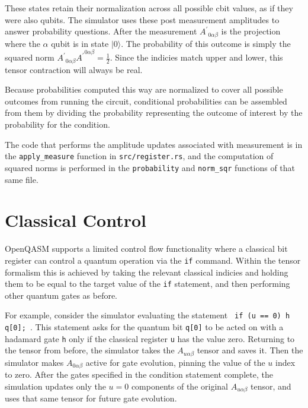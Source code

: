 \documentclass[%
 reprint,
 amsmath,amssymb,
 aps,
]{revtex4-2}
\begin{document}
These states retain their normalization across all possible cbit values, as if they were also qubits. The simulator uses these post measurement amplitudes to answer probability questions. After the measurement ${A^\prime}_{0 \alpha\beta}$ is the projection where the $\alpha$ qubit is in state $|0\rangle$. The probability of this outcome is simply the squared norm ${A^\prime}_{0 \alpha\beta}{A^\prime}^{0 \alpha\beta} = \frac{1}{2}$. Since the indicies match upper and lower, this tensor contraction will always be real. 

Because probabilities computed this way are normalized to cover all possible outcomes from running the circuit, conditional probabilities can be assembled from them by dividing the probability representing the outcome of interest by the probability for the condition. 

The code that performs the amplitude updates associated with measurement is in the \texttt{apply\_measure} function in \texttt{src/register.rs}, and the computation of squared norms is performed in the \texttt{probability} and \texttt{norm\_sqr}  functions of that same file.


\section{\label{sec:level1} \label{control} Classical Control}
OpenQASM supports a limited control flow functionality where a classical bit register can control a quantum operation via the \texttt{if} command. Within the tensor formalism this is achieved by taking the relevant classical indicies and holding them to be equal to the target value of the \texttt{if} statement, and then performing other quantum gates as before.

For example, consider the simulator evaluating the statement \texttt{ if (u == 0) h q[0]; }. This statement asks for the quantum bit \texttt{q[0]} to be acted on with a hadamard gate \texttt{h} only if the classical register \texttt{u} has the value zero. Returning to the tensor from before, the simulator takes the $A_{u\alpha\beta}$ tensor and saves it. Then the simulator makes $A_{0\alpha\beta}$ active for gate evolution, pinning the value of the $u$ index to zero. After the gates specified in the condition statement complete, the simulation updates only the $u=0$ components of the original $A_{u\alpha\beta}$ tensor, and uses that same tensor for future gate evolution.
\end{document}
